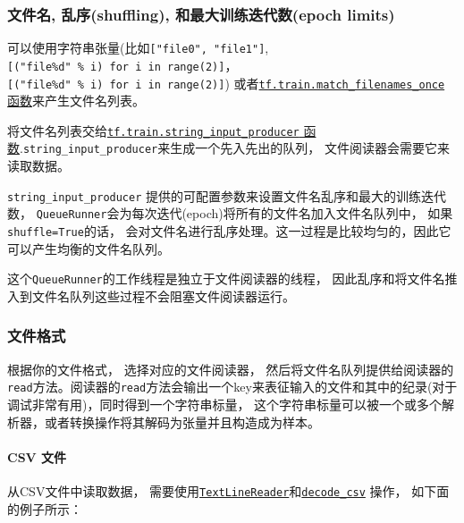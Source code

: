 \subsubsection{文件名, 乱序(shuffling), 和最大训练迭代数(epoch limits)
}\label{ux6587ux4ef6ux540d-ux4e71ux5e8fshuffling-ux548cux6700ux5927ux8badux7ec3ux8fedux4ee3ux6570epoch-limits}

可以使用字符串张量(比如\texttt{{[}"file0",\ "file1"{]}},
\texttt{{[}("file\%d"\ \%\ i)\ for\ i\ in\ range(2){]}}，
\texttt{{[}("file\%d"\ \%\ i)\ for\ i\ in\ range(2){]}})
或者\href{tensorflow-zh/SOURCE/api_docs/python/io_ops.md\#match_filenames_once}{\texttt{tf.train.match\_filenames\_once}
函数}来产生文件名列表。

将文件名列表交给\href{tensorflow-zh/SOURCE/api_docs/python/io_ops.md\#string_input_producer}{\texttt{tf.train.string\_input\_producer}
函数}.\texttt{string\_input\_producer}来生成一个先入先出的队列，
文件阅读器会需要它来读取数据。

\texttt{string\_input\_producer}
提供的可配置参数来设置文件名乱序和最大的训练迭代数，
\texttt{QueueRunner}会为每次迭代(epoch)将所有的文件名加入文件名队列中，
如果\texttt{shuffle=True}的话，
会对文件名进行乱序处理。这一过程是比较均匀的，因此它可以产生均衡的文件名队列。

这个\texttt{QueueRunner}的工作线程是独立于文件阅读器的线程，
因此乱序和将文件名推入到文件名队列这些过程不会阻塞文件阅读器运行。

\subsubsection{文件格式 }\label{ux6587ux4ef6ux683cux5f0f}

根据你的文件格式， 选择对应的文件阅读器，
然后将文件名队列提供给阅读器的\texttt{read}方法。阅读器的\texttt{read}方法会输出一个key来表征输入的文件和其中的纪录(对于调试非常有用)，同时得到一个字符串标量，
这个字符串标量可以被一个或多个解析器，或者转换操作将其解码为张量并且构造成为样本。

\paragraph{CSV 文件 }\label{csv-ux6587ux4ef6}

从CSV文件中读取数据，
需要使用\href{tensorflow-zh/SOURCE/api_docs/python/io_ops.md\#TextLineReader}{\texttt{TextLineReader}}和\href{tensorflow-zh/SOURCE/api_docs/python/io_ops.md\#decode_csv}{\texttt{decode\_csv}}
操作， 如下面的例子所示：

